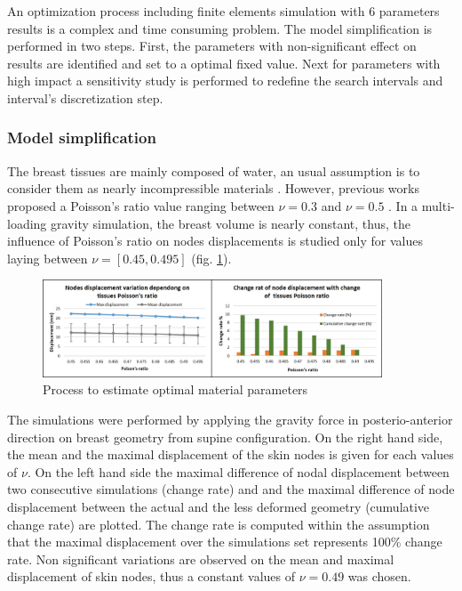  An optimization process including finite elements simulation with 6 parameters results is a complex and time consuming problem. The model simplification is performed in two steps. First, the parameters with non-significant effect on results are identified and set to a optimal fixed value. Next for parameters with high impact a sensitivity study is performed to redefine the search intervals and interval's discretization step.
 
 \subsubsection*{Model simplification}

The breast tissues are mainly composed of water, an usual assumption  is to consider them as nearly incompressible materials \citep{fung_biomechanics_2013}. However,
previous works proposed a Poisson's ratio value ranging between $\nu = 0.3$ \citep{hopp_automatic_2013} and $\nu = 0.5$ \citep{gamage_modelling_2012}. In a multi-loading gravity simulation, the breast volume is nearly constant, thus, the influence of  Poisson's ratio on nodes displacements is studied only for values laying between $\nu = [0.45 , 0.495]$ (fig. \ref{fig:poissonRatio}). 

\begin{figure}[!h]
\centering
\includegraphics[width=0.9\textwidth,keepaspectratio]{figures/poissonRatio.jpg} 
\caption{Process to estimate optimal material parameters}\label{fig:poissonRatio}
\end{figure}

The simulations were performed by applying the gravity force in posterio-anterior direction on breast geometry from supine configuration. On the right hand side, the mean and the maximal displacement of the skin nodes is given for each values of $\nu$. On the left hand side the maximal difference of nodal displacement between two consecutive simulations (change rate) and and the maximal difference of node displacement between the actual and the less deformed geometry (cumulative change rate) are plotted. The change rate is computed within the assumption that the maximal displacement over the simulations set represents 100\% change rate. Non significant variations are observed on the mean and maximal displacement of skin nodes, thus a constant values of $\nu = 0.49$ was chosen.


